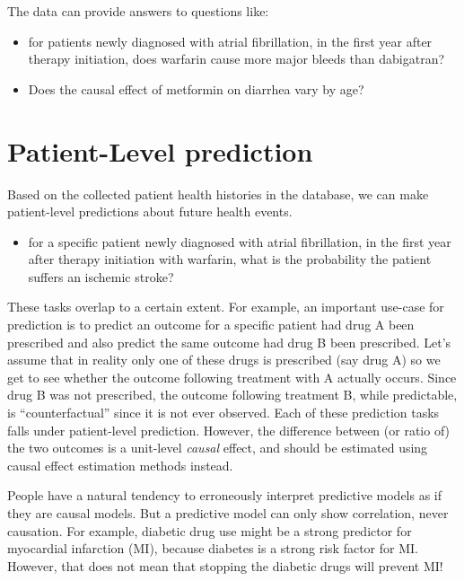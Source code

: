 \documentclass[11pt]{book}
\providecommand{\tightlist}{%
  \setlength{\itemsep}{0pt}\setlength{\parskip}{0pt}}
\let\BeginKnitrBlock\begin \let\EndKnitrBlock\end
\begin{document}
The data can provide answers to questions like:

\begin{itemize}
\tightlist
\item
  for patients newly diagnosed with atrial fibrillation, in the first
  year after therapy initiation, does warfarin cause more major bleeds
  than dabigatran?
\item
  Does the causal effect of metformin on diarrhea vary by age?
\end{itemize}

\section{Patient-Level prediction}\label{patient-level-prediction}

Based on the collected patient health histories in the database, we can
make patient-level predictions about future health events.

\begin{itemize}
\tightlist
\item
  for a specific patient newly diagnosed with atrial fibrillation, in
  the first year after therapy initiation with warfarin, what is the
  probability the patient suffers an ischemic stroke?
\end{itemize}

These tasks overlap to a certain extent. For example, an important
use-case for prediction is to predict an outcome for a specific patient
had drug A been prescribed and also predict the same outcome had drug B
been prescribed. Let's assume that in reality only one of these drugs is
prescribed (say drug A) so we get to see whether the outcome following
treatment with A actually occurs. Since drug B was not prescribed, the
outcome following treatment B, while predictable, is ``counterfactual''
since it is not ever observed. Each of these prediction tasks falls
under patient-level prediction. However, the difference between (or
ratio of) the two outcomes is a unit-level \emph{causal} effect, and
should be estimated using causal effect estimation methods instead.

\BeginKnitrBlock{rmdimportant}
People have a natural tendency to erroneously interpret predictive
models as if they are causal models. But a predictive model can only
show correlation, never causation. For example, diabetic drug use might
be a strong predictor for myocardial infarction (MI), because diabetes
is a strong risk factor for MI. However, that does not mean that
stopping the diabetic drugs will prevent MI!
\EndKnitrBlock{rmdimportant}
\end{document}
